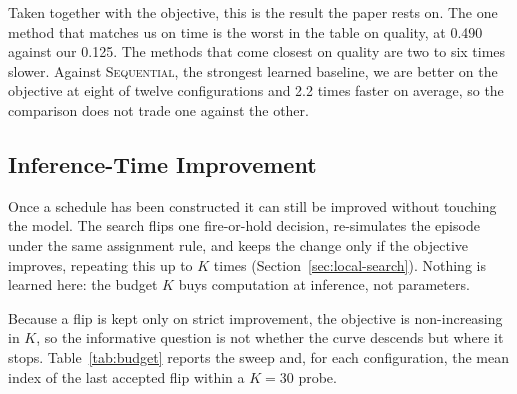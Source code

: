 Taken together with the objective, this is the result the paper rests on. The
one method that matches us on time is the worst in the table on quality, at
0.490 against our 0.125. The methods that come closest on quality are two to
six times slower. Against \textsc{Sequential}, the strongest learned baseline,
we are better on the objective at eight of twelve configurations and
2.2 times faster on average, so the comparison does not trade one against the
other.

\subsection{Inference-Time Improvement}
\label{sec:budget}

Once a schedule has been constructed it can still be improved without
touching the model. The search flips one fire-or-hold decision, re-simulates
the episode under the same assignment rule, and keeps the change only if the
objective improves, repeating this up to $K$ times
(Section~\ref{sec:local-search}). Nothing is learned here: the budget $K$ buys
computation at inference, not parameters.

Because a flip is kept only on strict improvement, the objective is
non-increasing in $K$, so the informative question is not whether the curve
descends but where it stops. Table~\ref{tab:budget} reports the sweep and, for
each configuration, the mean index of the last accepted flip within a $K{=}30$
probe.

